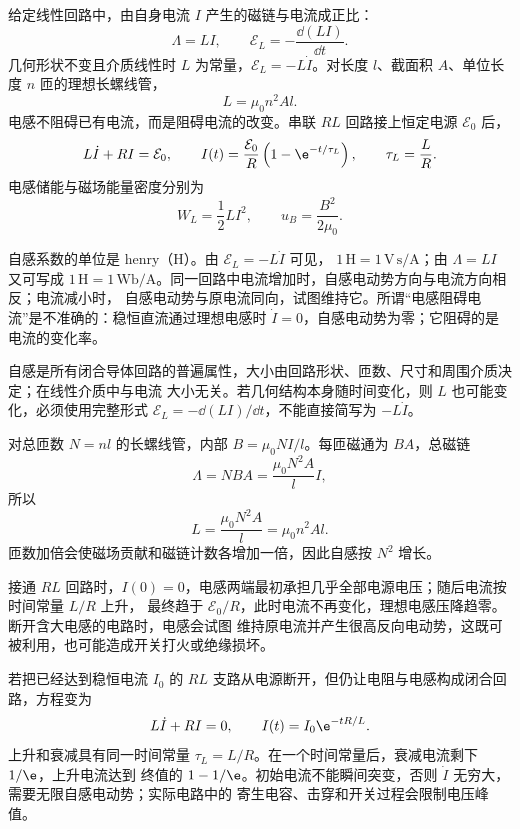 给定线性回路中，由自身电流 $I$ 产生的磁链与电流成正比：
\begin{equation}
  \boxed{\Lambda=LI},
  \qquad
  \boxed{\mathcal E_L=-\frac{\dd(LI)}{\dd t}}.
\end{equation}
几何形状不变且介质线性时 $L$ 为常量，$\mathcal E_L=-L\dot I$。对长度 $l$、截面积 $A$、单位长度
$n$ 匝的理想长螺线管，
\begin{equation}
  \boxed{L=\mu_0n^2Al}.
\end{equation}
电感不阻碍已有电流，而是阻碍电流的改变。串联 $RL$ 回路接上恒定电源 $\mathcal E_0$ 后，
\begin{equation}
  L\dot I+RI=\mathcal E_0,
  \qquad
  I(t)=\frac{\mathcal E_0}{R}\left(1-\e^{-t/\tau_L}\right),
  \qquad \tau_L=\frac LR.
\end{equation}
电感储能与磁场能量密度分别为
\begin{equation}
  \boxed{W_L=\frac12LI^2},
  \qquad
  \boxed{u_B=\frac{B^2}{2\mu_0}}.
\end{equation}

自感系数的单位是 henry（H）。由 $\mathcal E_L=-L\dot I$ 可见，
$1\,\mathrm H=1\,\mathrm{V\,s/A}$；由 $\Lambda=LI$ 又可写成
$1\,\mathrm H=1\,\mathrm{Wb/A}$。同一回路中电流增加时，自感电动势方向与电流方向相反；电流减小时，
自感电动势与原电流同向，试图维持它。所谓“电感阻碍电流”是不准确的：稳恒直流通过理想电感时
$\dot I=0$，自感电动势为零；它阻碍的是电流的变化率。

自感是所有闭合导体回路的普遍属性，大小由回路形状、匝数、尺寸和周围介质决定；在线性介质中与电流
大小无关。若几何结构本身随时间变化，则 $L$ 也可能变化，必须使用完整形式
$\mathcal E_L=-\dd(LI)/\dd t$，不能直接简写为 $-L\dot I$。

对总匝数 $N=nl$ 的长螺线管，内部 $B=\mu_0NI/l$。每匝磁通为 $BA$，总磁链
\begin{equation}
  \Lambda=NBA=\frac{\mu_0N^2A}{l}I,
\end{equation}
所以
\begin{equation}
  L=\frac{\mu_0N^2A}{l}=\mu_0n^2Al.
\end{equation}
匝数加倍会使磁场贡献和磁链计数各增加一倍，因此自感按 $N^2$ 增长。

接通 $RL$ 回路时，$I(0)=0$，电感两端最初承担几乎全部电源电压；随后电流按时间常量 $L/R$ 上升，
最终趋于 $\mathcal E_0/R$，此时电流不再变化，理想电感压降趋零。断开含大电感的电路时，电感会试图
维持原电流并产生很高反向电动势，这既可被利用，也可能造成开关打火或绝缘损坏。

若把已经达到稳恒电流 $I_0$ 的 $RL$ 支路从电源断开，但仍让电阻与电感构成闭合回路，方程变为
\begin{equation}
  L\dot I+RI=0,\qquad I(t)=I_0\e^{-tR/L}.
\end{equation}
上升和衰减具有同一时间常量 $\tau_L=L/R$。在一个时间常量后，衰减电流剩下 $1/\e$，上升电流达到
终值的 $1-1/\e$。初始电流不能瞬间突变，否则 $\dot I$ 无穷大，需要无限自感电动势；实际电路中的
寄生电容、击穿和开关过程会限制电压峰值。

